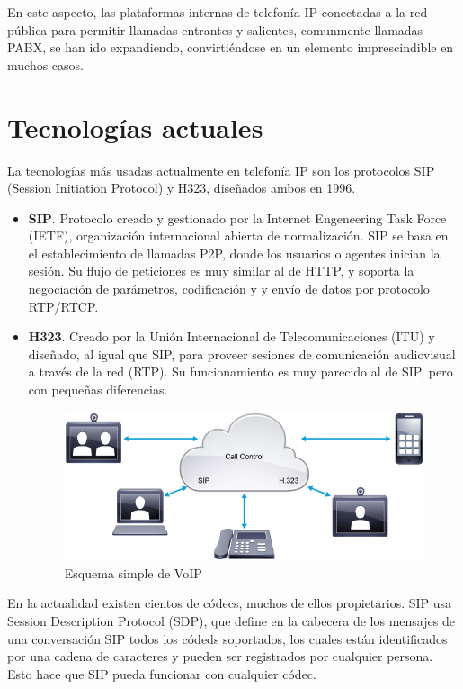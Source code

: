 \documentclass[a4paper, 12pt]{book}
\begin{document}
En este aspecto, las plataformas internas de telefonía IP conectadas a la red pública para permitir llamadas entrantes y salientes, comunmente llamadas PABX, se han ido expandiendo, convirtiéndose en un elemento imprescindible en muchos casos. 

\section{Tecnologías actuales}
\label{sec:tecnologias-actuales}

La tecnologías más usadas actualmente en telefonía IP son los protocolos SIP (Session Initiation Protocol) y H323, diseñados ambos en 1996.
\begin{itemize}
  \item  \textbf{SIP}. Protocolo creado y gestionado por la Internet Engeneering Task Force (IETF), organización internacional abierta de normalización. SIP se basa en el establecimiento de llamadas P2P, donde los usuarios o agentes inician la sesión. Su flujo de peticiones es muy similar al de HTTP, y soporta la negociación de parámetros, codificación y y envío de datos por protocolo RTP/RTCP.
  \item \textbf{H323}. Creado por la Unión Internacional de Telecomunicaciones (ITU) y diseñado, al igual que SIP, para proveer sesiones de comunicación audiovisual a través de la red (RTP). Su funcionamiento es muy parecido al de SIP, pero con pequeñas diferencias.
  \\
  \begin{figure}[h]
    \centering
    \includegraphics{img/fig_diagrama_simple_collab}
    \caption{Esquema simple de VoIP}
    \label{figura:fig_diagrama_simple_collab}
  \end{figure}
\end{itemize}

En la actualidad existen cientos de códecs, muchos de ellos propietarios. SIP usa Session Description Protocol (SDP), que define en la cabecera de los mensajes de una conversación SIP todos los códeds soportados, los cuales están identificados por una cadena de caracteres y pueden ser registrados por cualquier persona. Esto hace que SIP pueda funcionar con cualquier códec. 
\end{document}
